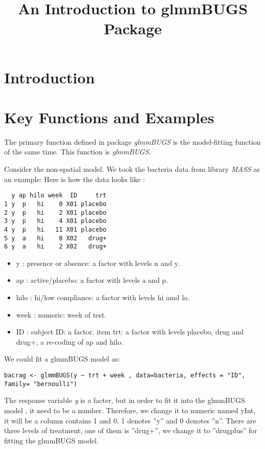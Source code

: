 \documentclass{article}
\title{An Introduction to glmmBUGS Package}
\begin{document}
\maketitle

\large
\section{Introduction}
 


\section{Key Functions and Examples}
The primary function defined in package \textit{glmmBUGS} is the model-fitting function of the same time.
This function is \textit{glmmBUGS}. 

Consider the non-spatial model. We took the bacteria data from library \textit{MASS} as an example: 
Here is how the data looks like : 
\begin{verbatim}
  y ap hilo week  ID     trt
1 y  p   hi    0 X01 placebo
2 y  p   hi    2 X01 placebo
3 y  p   hi    4 X01 placebo
4 y  p   hi   11 X01 placebo
5 y  a   hi    0 X02   drug+
6 y  a   hi    2 X02   drug+
\end{verbatim}
\begin{itemize}
\item y : presence or absence: a factor with levels n and y. 
\item ap : active/placebo: a factor with levels a and p. 
\item hilo : hi/low compliance: a factor with levels hi amd lo. 
\item week : numeric: week of test. 
\item ID : subject ID: a factor. 
item trt: a factor with levels placebo, drug and drug+, a re-coding of ap and hilo. 
\end{itemize} 

We could fit a glmmBUGS model as: 
\begin{verbatim}
bacrag <- glmmBUGS(y ~ trt + week , data=bacteria, effects = "ID", family= "bernoulli") 
\end{verbatim}

The response variable \textit{y} is a facter, but in order to fit it into the glmmBUGS model , it need to be a number. Therefore, we change it to numeric named yInt, it will be a column contains 1 and 0. 1 denotes ''y'' and 0 denotes ''n''. There are three 
levels of treatment, one of them is ''drug+'', we change it to ''drugplus'' for fitting the glmmBUGS model.
\end{document}
